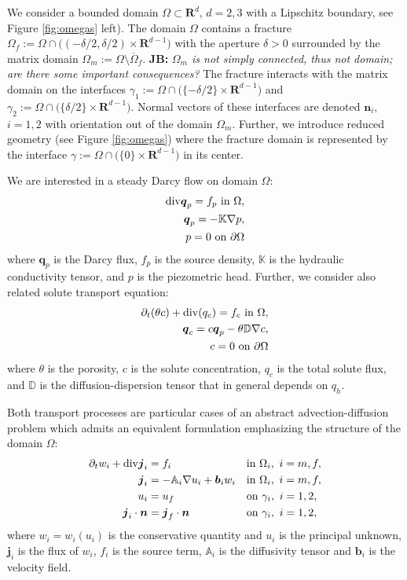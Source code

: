 \documentclass[a4paper]{article}
\def\prtl{\partial}
\def\vc#1{\mathbf{\boldsymbol{#1}}}     %
\def\tn#1{{\mathbb{#1}}}    %
\def\div{{\rm div}}
\def\grad{\nabla}
\def\Real{{\mathbf R}}
\newcommand{\note}[2]{{\color{blue} \textbf{ #1:} \textit{#2}}}
\begin{document}
We consider a bounded domain $\Omega \subset \Real^d$, $d=2,3$ with a Lipschitz boundary, see Figure \ref{fig:omegas} left). The domain $\Omega$ contains 
a fracture $\Omega_f:=\Omega\cap \big((-\delta/2,\delta/2)\times\Real^{d-1}\big)$ 
with the aperture $\delta>0$ surrounded by the matrix domain $\Omega_m:=\Omega\setminus\overline\Omega_f$. 
\note{JB}{$\Omega_m$ is not simply connected, thus not domain; are there some important consequences?}
The fracture interacts with the matrix domain on the interfaces 
$\gamma_1:=\Omega\cap\big( \{-\delta/2\}\times \Real^{d-1}\big)$ and 
$\gamma_2:=\Omega\cap\big( \{ \delta/2\}\times \Real^{d-1}\big)$. Normal vectors of these interfaces are denoted $\vc n_i$, $i=1,2$ with orientation out of the domain $\Omega_m$.
Further, we introduce reduced geometry (see Figure \ref{fig:omegas})
where the fracture domain is represented by the interface $\gamma:=\Omega\cap\big(\{0\}\times\Real^{d-1}\big)$ in its center. 

We are interested in a steady Darcy flow on domain $\Omega$:
\begin{subequations}
\label{eq:darcy_flow}
\begin{align}
    \div \vc q_p = f_p \mbox{ in }\Omega, \\
    \vc q_p = -\tn K \grad p, \\
    p=0\mbox{ on }\partial\Omega
\end{align}
\end{subequations}
where $\vc q_p$ is the Darcy flux, $f_p$ is the source density, $\tn K$ is the hydraulic conductivity tensor, and $p$ is the piezometric head.
Further, we consider also related solute transport equation:
\begin{align}
    \label{eq:solute_transport}
    \prtl_t (\theta c) + \div(q_c) = f_c \mbox{ in }\Omega,\\
    \vc q_c = c \vc q_p - \theta \tn D \grad c, \\
    c=0\mbox{ on }\partial\Omega
\end{align}
where $\theta$ is the porosity, $c$ is the solute concentration, $q_c$ is the total solute flux, and $\tn D$ is the diffusion-dispersion tensor that in general depends on $q_h$.

Both transport processes are particular cases of an abstract advection-diffusion problem which admits an equivalent formulation
emphasizing the structure of the domain $\Omega$:
\begin{align}
  \label{eq:full:continuity}
  \prtl_t w_i + \div \vc j_i &= f_i&&  \text{in } \Omega_i,\ i=m,f,\\
  \label{eq:full:flux}
  \vc j_i &= - \tn A_i\grad u_i + \vc b_i w_i&& \text{in } \Omega_i,\ i=m,f,\\
  \label{eq:full:Dirichlet}
  u_i &= u_f&& \text{on } \gamma_i,\ i=1,2,\\
  \label{eq:full:Neumann}
  \vc j_i \cdot \vc n &= \vc j_f \cdot \vc n&& \text{on } \gamma_i,\ i=1,2,
\end{align}
where $w_i=w_i(u_i)$ is the conservative quantity and $u_i$ is the principal unknown, $\vc j_i$ is the flux of $w_i$, $f_i$ is the source term,
$\tn A_i$ is the diffusivity tensor and $\vc b_i$ is the velocity field. 
\end{document}

